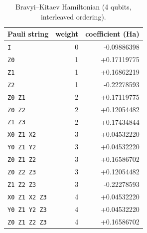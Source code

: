 \begin{table}[H]
\centering\small
\begin{tabular}{lrr}
\toprule
Pauli string & weight & coefficient (Ha) \\
\midrule
\texttt{I} & 0 & -0.09886398 \\
\texttt{Z0} & 1 & +0.17119775 \\
\texttt{Z1} & 1 & +0.16862219 \\
\texttt{Z2} & 1 & -0.22278593 \\
\texttt{Z0\,Z1} & 2 & +0.17119775 \\
\texttt{Z0\,Z2} & 2 & +0.12054482 \\
\texttt{Z1\,Z3} & 2 & +0.17434844 \\
\texttt{X0\,Z1\,X2} & 3 & +0.04532220 \\
\texttt{Y0\,Z1\,Y2} & 3 & +0.04532220 \\
\texttt{Z0\,Z1\,Z2} & 3 & +0.16586702 \\
\texttt{Z0\,Z2\,Z3} & 3 & +0.12054482 \\
\texttt{Z1\,Z2\,Z3} & 3 & -0.22278593 \\
\texttt{X0\,Z1\,X2\,Z3} & 4 & +0.04532220 \\
\texttt{Y0\,Z1\,Y2\,Z3} & 4 & +0.04532220 \\
\texttt{Z0\,Z1\,Z2\,Z3} & 4 & +0.16586702 \\
\bottomrule
\end{tabular}
\caption{Bravyi--Kitaev Hamiltonian (4 qubits, interleaved ordering).}
\end{table}
